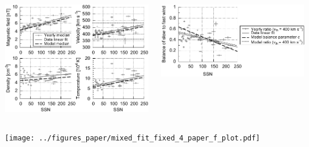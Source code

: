 \documentclass[11pt,aspectratio=1610]{beamer}	%
\newcommand{\captionoftiny}[2]{\captionof{#1}{\color{gray} \tiny #2}}
\begin{document}
\begin{frame}[c]{}{}
	\begin{columns}[c]
		
		\includegraphics[width=\textwidth]{../figures_paper/OMNI_yearly_BVNTvsSSN_a.pdf}


		\includegraphics[width=\textwidth]{../figures_paper/Vdbl_SSN_ratio_f_plot.pdf}

	\end{columns}
\end{frame}
\begin{frame}[c]{}{}
	\texttt{[image: ../figures\_paper/mixed\_fit\_fixed\_4\_paper\_f\_plot.pdf]}
\end{frame}
\end{document}
